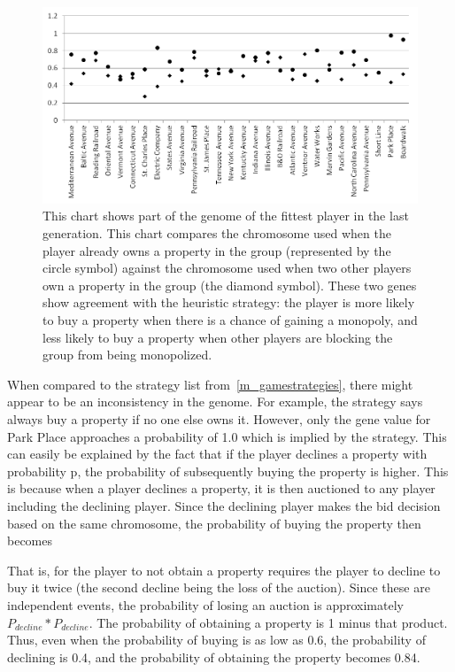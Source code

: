 \begin{figure}[htp]
\centerline{\includegraphics[width=0.75\columnwidth]{Figures/genome.png}}
\caption[Illustration of Genome]{This chart shows part of the genome of the
fittest player in the last generation. This chart compares the chromosome used
when the player already owns a property in the group (represented by the circle
symbol) against the chromosome used when two other players own a property in the
group (the diamond symbol). These two genes show agreement with the heuristic
strategy: the player is more likely to buy a property when there is a chance of
gaining a monopoly, and less likely to buy a property when other players are
blocking the group from being monopolized.}
\label{figure-genome}
\end{figure}

When compared to the strategy list from~\ref{m_gamestrategies}, there might
appear to be an inconsistency in the genome. For example, the strategy says
always buy a property if no one else owns it. However, only the gene value for
Park Place approaches a probability of 1.0 which is implied by the strategy.
This can easily be explained by the fact that if the player declines a property
with probability p, the probability of subsequently buying the property is
higher. This is because when a player declines a property, it is then auctioned
to any player including the declining player. Since the declining player makes
the bid decision based on the same chromosome, the probability of buying the
property then becomes

That is, for the player to not obtain a property requires the player to decline
to buy it twice (the second decline being the loss of the auction). Since these
are independent events, the probability of losing an auction is approximately
\(P_{decline} * P_{decline}\). The probability of obtaining a property is 1
minus that product. Thus, even when the probability of buying is as low as 0.6,
the probability of declining is 0.4, and the probability of obtaining the
property becomes 0.84.

